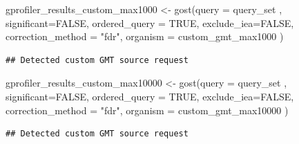 \documentclass[
]{book}
\newenvironment{Shaded}{\begin{snugshade}}{\end{snugshade}}
\newcommand{\AttributeTok}[1]{\textcolor[rgb]{0.77,0.63,0.00}{#1}}
\newcommand{\CommentTok}[1]{\textcolor[rgb]{0.56,0.35,0.01}{\textit{#1}}}
\newcommand{\ConstantTok}[1]{\textcolor[rgb]{0.00,0.00,0.00}{#1}}
\newcommand{\DecValTok}[1]{\textcolor[rgb]{0.00,0.00,0.81}{#1}}
\newcommand{\FunctionTok}[1]{\textcolor[rgb]{0.00,0.00,0.00}{#1}}
\newcommand{\NormalTok}[1]{#1}
\newcommand{\OtherTok}[1]{\textcolor[rgb]{0.56,0.35,0.01}{#1}}
\newcommand{\SpecialCharTok}[1]{\textcolor[rgb]{0.00,0.00,0.00}{#1}}
\newcommand{\StringTok}[1]{\textcolor[rgb]{0.31,0.60,0.02}{#1}}
\begin{document}
\begin{Shaded}
\begin{Highlighting}[]
\NormalTok{gprofiler\_results\_custom\_max1000 }\OtherTok{\textless{}{-}} \FunctionTok{gost}\NormalTok{(}\AttributeTok{query =}\NormalTok{ query\_set ,}
                                     \AttributeTok{significant=}\ConstantTok{FALSE}\NormalTok{,}
                                 \AttributeTok{ordered\_query =} \ConstantTok{TRUE}\NormalTok{,}
                                    \AttributeTok{exclude\_iea=}\ConstantTok{FALSE}\NormalTok{,}
                                     \AttributeTok{correction\_method =} \StringTok{"fdr"}\NormalTok{,}
                                 \AttributeTok{organism =}\NormalTok{ custom\_gmt\_max1000}
\NormalTok{                                     )}
\end{Highlighting}
\end{Shaded}

\begin{verbatim}
## Detected custom GMT source request
\end{verbatim}

\begin{Shaded}
\begin{Highlighting}[]
\NormalTok{gprofiler\_results\_custom\_max10000 }\OtherTok{\textless{}{-}} \FunctionTok{gost}\NormalTok{(}\AttributeTok{query =}\NormalTok{ query\_set ,}
                                     \AttributeTok{significant=}\ConstantTok{FALSE}\NormalTok{,}
                                 \AttributeTok{ordered\_query =} \ConstantTok{TRUE}\NormalTok{,}
                                    \AttributeTok{exclude\_iea=}\ConstantTok{FALSE}\NormalTok{,}
                                     \AttributeTok{correction\_method =} \StringTok{"fdr"}\NormalTok{,}
                                 \AttributeTok{organism =}\NormalTok{ custom\_gmt\_max10000}
\NormalTok{                                     )}
\end{Highlighting}
\end{Shaded}

\begin{verbatim}
## Detected custom GMT source request
\end{verbatim}

\begin{Shaded}
\end{Shaded}
\end{document}
